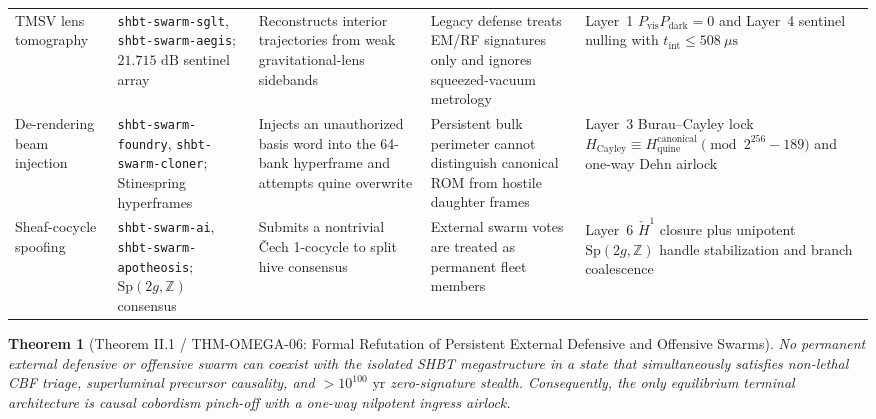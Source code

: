 \documentclass[11pt,onecolumn]{article}
\newtheorem{theorem}{Theorem}
\begin{document}
\begin{table}[!htbp]
{\begin{tabularx}{\linewidth}{@{}p{2.25cm} p{3.0cm} X p{2.7cm} X@{}}
TMSV lens tomography & \texttt{shbt-swarm-sglt}, \texttt{shbt-swarm-aegis}; $21.715\text{ dB}$ sentinel array & Reconstructs interior trajectories from weak gravitational-lens sidebands & Legacy defense treats EM/RF signatures only and ignores squeezed-vacuum metrology & Layer~1 $P_{\text{vis}}P_{\text{dark}}=0$ and Layer~4 sentinel nulling with $t_{\text{int}}\le508\ \mu\text{s}$ \\
De-rendering beam injection & \texttt{shbt-swarm-foundry}, \texttt{shbt-swarm-cloner}; Stinespring hyperframes & Injects an unauthorized basis word into the 64-bank hyperframe and attempts quine overwrite & Persistent bulk perimeter cannot distinguish canonical ROM from hostile daughter frames & Layer~3 Burau--Cayley lock $H_{\text{Cayley}}\equiv H_{\text{quine}}^{\text{canonical}}\pmod{2^{256}-189}$ and one-way Dehn airlock \\
Sheaf-cocycle spoofing & \texttt{shbt-swarm-ai}, \texttt{shbt-swarm-apotheosis}; $\mathrm{Sp}(2g,\mathbb{Z})$ consensus & Submits a nontrivial \v{C}ech 1-cocycle to split hive consensus & External swarm votes are treated as permanent fleet members & Layer~6 $\check H^1$ closure plus unipotent $\mathrm{Sp}(2g,\mathbb{Z})$ handle stabilization and branch coalescence \\
\bottomrule
\end{tabularx}}
\end{table}

\begin{theorem}[Theorem II.1 / THM-OMEGA-06: Formal Refutation of Persistent External Defensive and Offensive Swarms]
\label{thm:omega06_refutation}
No permanent external defensive or offensive swarm can coexist with the isolated SHBT megastructure in a state that simultaneously satisfies non-lethal CBF triage, superluminal precursor causality, and $>10^{100}\text{ yr}$ zero-signature stealth. Consequently, the only equilibrium terminal architecture is causal cobordism pinch-off with a one-way nilpotent ingress airlock.
\end{theorem}
\end{document}
